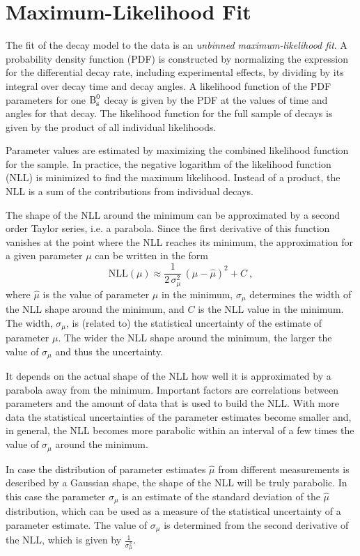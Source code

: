 \section{Maximum-Likelihood Fit}
\label{sec:ana_fit}

The fit of the decay model to the data is an \emph{unbinned maximum-likelihood fit}. A probability density function (PDF) is constructed by
normalizing the expression for the differential decay rate, including experimental effects, by dividing by its integral over decay time and
decay angles. A likelihood function of the PDF parameters for one $\text{B}_\text{s}^\text{0}$ decay is given by the PDF at the values of time and angles for
that decay. The likelihood function for the full sample of decays is given by the product of all individual likelihoods.

Parameter values are estimated by maximizing the combined likelihood function for the sample. In practice, the negative logarithm of the
likelihood function (NLL) is minimized to find the maximum likelihood. Instead of a product, the NLL is a sum of the contributions from
individual decays.

The shape of the NLL around the minimum can be approximated by a second order Taylor series, i.e. a parabola. Since the first derivative of
this function vanishes at the point where the NLL reaches its minimum, the approximation for a given parameter $\mu$ can be written in the
form
\begin{equation}
  \label{eq:NLLPara}
  \text{NLL}(\mu) \approx \frac{1}{2\,\sigma_\mu^2}\, (\mu-\hat{\mu})^2 + C \ ,
\end{equation}
where $\hat{\mu}$ is the value of parameter $\mu$ in the minimum, $\sigma_\mu$ determines the width of the NLL shape around the minimum,
and $C$ is the NLL value in the minimum. The width, $\sigma_\mu$, is (related to) the statistical uncertainty of the estimate of parameter
$\mu$. The wider the NLL shape around the minimum, the larger the value of $\sigma_\mu$ and thus the uncertainty.

It depends on the actual shape of the NLL how well it is approximated by a parabola away from the minimum. Important factors are
correlations between parameters and the amount of data that is used to build the NLL. With more data the statistical uncertainties of
the parameter estimates become smaller and, in general, the NLL becomes more parabolic within an interval of a few times the value of
$\sigma_\mu$ around the minimum.

In case the distribution of parameter estimates $\hat{\mu}$ from different measurements is described by a Gaussian shape, the shape of the
NLL will be truly parabolic. In this case the parameter $\sigma_\mu$ is an estimate of the standard deviation of the $\hat{\mu}$
distribution, which can be used as a measure of the statistical uncertainty of a parameter estimate. The value of $\sigma_\mu$ is
determined from the second derivative of the NLL, which is given by $\frac{1}{\sigma_\mu^2}$.

